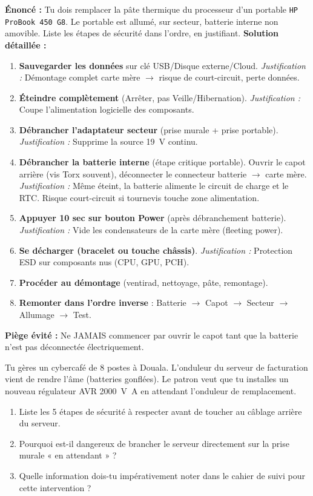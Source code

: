 \documentclass[11pt]{article}
\begin{document}
\begin{exoresolu}
\textbf{Énoncé :} Tu dois remplacer la pâte thermique du processeur d'un portable \texttt{HP ProBook 450 G8}. Le portable est allumé, sur secteur, batterie interne non amovible. Liste les étapes de sécurité dans l'ordre, en justifiant.
\textbf{Solution détaillée :}
\begin{enumerate}
    \item \textbf{Sauvegarder les données} sur clé USB/Disque externe/Cloud. \textit{Justification :} Démontage complet carte mère $\rightarrow$ risque de court-circuit, perte données.
    \item \textbf{Éteindre complètement} (Arrêter, pas Veille/Hibernation). \textit{Justification :} Coupe l'alimentation logicielle des composants.
    \item \textbf{Débrancher l'adaptateur secteur} (prise murale + prise portable). \textit{Justification :} Supprime la source \SI{19}{\volt} continu.
    \item \textbf{Débrancher la batterie interne} (étape critique portable). Ouvrir le capot arrière (vis Torx souvent), déconnecter le connecteur batterie $\rightarrow$ carte mère. \textit{Justification :} Même éteint, la batterie alimente le circuit de charge et le RTC. Risque court-circuit si tournevis touche zone alimentation.
    \item \textbf{Appuyer 10 sec sur bouton Power} (après débranchement batterie). \textit{Justification :} Vide les condensateurs de la carte mère (fleeting power).
    \item \textbf{Se décharger (bracelet ou touche châssis)}. \textit{Justification :} Protection ESD sur composants nus (CPU, GPU, PCH).
    \item \textbf{Procéder au démontage} (ventirad, nettoyage, pâte, remontage).
    \item \textbf{Remonter dans l'ordre inverse} : Batterie $\rightarrow$ Capot $\rightarrow$ Secteur $\rightarrow$ Allumage $\rightarrow$ Test.
\end{enumerate}
\textbf{Piège évité :} Ne JAMAIS commencer par ouvrir le capot tant que la batterie n'est pas déconnectée électriquement.
\end{exoresolu}

\begin{exercice}
Tu gères un cybercafé de 8 postes à Douala. L'onduleur du serveur de facturation vient de rendre l'âme (batteries gonflées). Le patron veut que tu installes un nouveau régulateur AVR \SI{2000}{\volt\ampere} en attendant l'onduleur de remplacement.
\begin{enumerate}
    \item Liste les 5 étapes de sécurité à respecter avant de toucher au câblage arrière du serveur.
    \item Pourquoi est-il dangereux de brancher le serveur directement sur la prise murale « en attendant » ?
    \item Quelle information dois-tu impérativement noter dans le cahier de suivi pour cette intervention ?
\end{enumerate}
\end{exercice}
\end{document}
